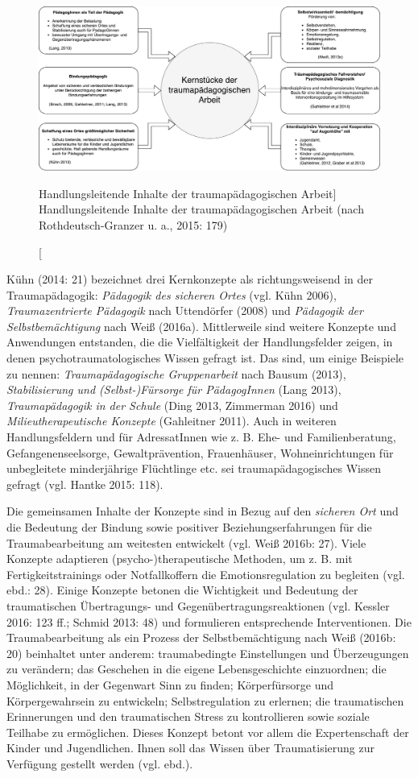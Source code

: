 \begin{figure}[h]
  \centering
  \includegraphics[scale=0.45]{abbildung2}
  \caption
      [Handlungsleitende Inhalte der traumapädagogischen Arbeit]
      {Handlungsleitende Inhalte der traumapädagogischen Arbeit (nach Rothdeutsch-Granzer u. a., 2015: 179)}
  \label{fig:inhalte}
\end{figure}

Kühn (2014: 21) bezeichnet drei Kernkonzepte als richtungsweisend in der Traumap{\"a}dagogik: \textit{Pädagogik des sicheren Ortes} (vgl. Kühn 2006), \textit{Traumazentrierte Pädagogik} nach Uttendörfer (2008) und \textit{Pädagogik der Selbstbemächtigung} nach Weiß (2016a). Mittlerweile sind weitere Konzepte und Anwendungen entstanden, die die Vielfältigkeit der Handlungsfelder zeigen, in denen psychotraumatologisches Wissen gefragt ist. Das sind, um einige Beispiele zu nennen: \textit{Traumapädagogische Gruppenarbeit} nach Bausum (2013), \textit{Stabilisierung und (Selbst-)Fürsorge für PädagogInnen} (Lang 2013), \textit{Traumapädagogik in der Schule} (Ding 2013, Zimmerman 2016) und \textit{Milieutherapeutische Konzepte} (Gahleitner 2011). Auch in weiteren Handlungsfeldern und für AdressatInnen wie z. B. Ehe- und Familienberatung, Gefangenenseelsorge, Gewaltprävention, Frauenhäuser, Wohneinrichtungen für unbegleitete minderjährige Flüchtlinge etc. sei traumapädagogisches Wissen gefragt (vgl. Hantke 2015: 118).  

Die gemeinsamen Inhalte der Konzepte sind in Bezug auf den \textit{sicheren Ort} und die Bedeutung der Bindung sowie positiver Beziehungserfahrungen für die Traumabearbeitung am weitesten entwickelt (vgl. Weiß 2016b: 27). Viele Konzepte adaptieren (psycho-)therapeutische Methoden, um z. B. mit Fertigkeitstrainings oder Notfallkoffern die Emotionsregulation zu begleiten (vgl. ebd.: 28). Einige Konzepte betonen die Wichtigkeit und Bedeutung der traumatischen Übertragungs- und Gegenübertragungsreaktionen (vgl. Kessler 2016: 123 ff.; Schmid 2013: 48) und formulieren entsprechende Interventionen. Die Traumabearbeitung als ein Prozess der Selbstbemächtigung nach Weiß (2016b: 20) beinhaltet unter anderem: traumabedingte Einstellungen und Überzeugungen zu verändern; das Geschehen in die eigene Lebensgeschichte einzuordnen; die Möglichkeit, in der Gegenwart Sinn zu finden; Körperfürsorge und Körpergewahrsein zu entwickeln; Selbstregulation zu erlernen; die traumatischen Erinnerungen und den traumatischen Stress zu kontrollieren sowie soziale Teilhabe zu ermöglichen. Dieses Konzept betont vor allem die Expertenschaft der Kinder und Jugendlichen. Ihnen soll das Wissen über Traumatisierung zur Verfügung gestellt werden (vgl. ebd.).  

